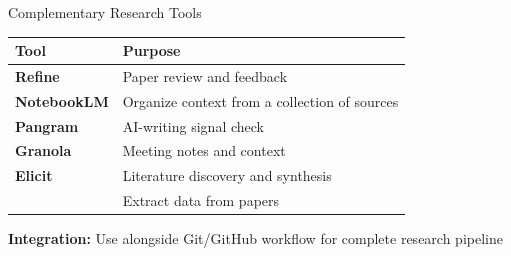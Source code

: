 \documentclass[11pt,aspectratio=169]{beamer}
\begin{document}
\begin{frame}{Complementary Research Tools}
\begin{table}
\small
\begin{tabular}{lp{6cm}}
\toprule
\textbf{Tool} & \textbf{Purpose} \\
\midrule
\textbf{Refine} & Paper review and feedback \\
\midrule
\textbf{NotebookLM} & Organize context from a collection of sources \\
\midrule
\textbf{Pangram} & AI-writing signal check \\
\midrule
\textbf{Granola} & Meeting notes and context \\
\midrule
\textbf{Elicit} & Literature discovery and synthesis \\
& Extract data from papers \\
\bottomrule
\end{tabular}
\end{table}

\vspace{0.2cm}
\textbf{Integration:} Use alongside Git/GitHub workflow for complete research pipeline
\end{frame}
\end{document}
